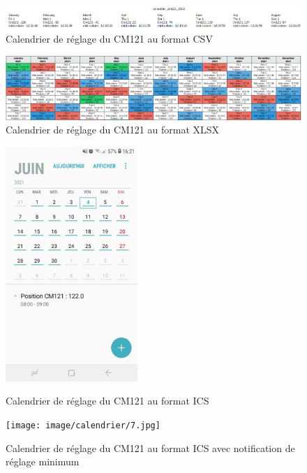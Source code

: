 \documentclass[12pt,a4paper]{article}
\begin{document}
\begin{flushleft}
\begin{figure}[H]
\centering
\includegraphics[width=16cm]{image/calendrier/3.PNG} 
\caption{Calendrier de réglage du CM121 au format CSV}  
\end{figure}

\begin{figure}[H]
\centering
\includegraphics[width=16cm]{image/calendrier/2.PNG} 
\caption{Calendrier de réglage du CM121 au format XLSX}  
\end{figure}


\begin{figure}[H]
    \begin{minipage}[c]{.46\linewidth}
        \centering
        \includegraphics[width=5cm]{image/calendrier/4.jpg} 
		\caption{Calendrier de réglage du CM121 au format ICS}
    \end{minipage}
    \hfill%
    \begin{minipage}[c]{.46\linewidth}
        \centering
        \texttt{[image: image/calendrier/7.jpg]} 
        \caption{Calendrier de réglage du CM121 au format ICS avec notification de réglage minimum}
    \end{minipage}
\end{figure}


\end{flushleft}
\end{document}
